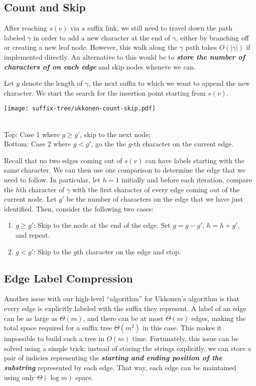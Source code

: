 \subsection{Count and Skip}

After reaching $s(v)$ via a suffix link, we still need to travel down the path labeled $\gamma$ in order to add a new character at the end of $\gamma$, either by branching off or creating a new leaf node. However, this walk along the $\gamma$ path takes $O(|\gamma|)$ if implemented directly. An alternative to this would be to \textit{\textbf{store the number of characters of on each edge}} and skip nodes wheneve we can.

Let $g$ denote the length of $\gamma$, the next suffix to which we want to append the new character. We start the search for the insertion point starting from $s(v)$.

\begin{marginfigure}
    \centering
    \texttt{[image: suffix-tree/ukkonen-count-skip.pdf]}
    \caption{\\Top: Case 1 where $g \geq g'$, skip to the next node; \\ Bottom: Case 2 where $g < g'$, go the the $g$-th character on the current edge.}
\end{marginfigure}

Recall that no two edges coming out of $s(v)$ can have labels starting with the same character. We can then use one comparison to determine the edge that we need to follow. In particular, let $h=1$ initially and before each iteration, compare the $h$th character of $\gamma$ with the first character of every edge coming out of the current node. Let $g'$ be the number of characters on the edge that we have just identified. Then, consider the following two cases:

\begin{enumerate}
    \item $g \geq g'$: Skip to the node at the end of the edge. Set $g = g - g'$, $h = h + g'$, and repeat.
    \item $g < g'$: Skip to the $g$th character on the edge and stop.
\end{enumerate}

\subsection{Edge Label Compression}

Another issue with our high-level ``algorithm'' for Ukkonen's algorithm is that every edge is explicitly labeled with the suffix they represent. A label of an edge can be as large as $\Theta(m)$, and there can be at most $\Theta(m)$ edges, making the total space required for a suffix tree $\Theta(m^2)$ in this case. This makes it impossible to build such a tree in $O(m)$ time. Fortunately, this issue can be solved using a simple trick: instead of storing the strings explicitly, we can store a pair of indicies representing the \textit{\textbf{starting and ending position of the substring}} represented by each edge. That way, each edge can be maintained using only $\Theta(\log m)$ space.

